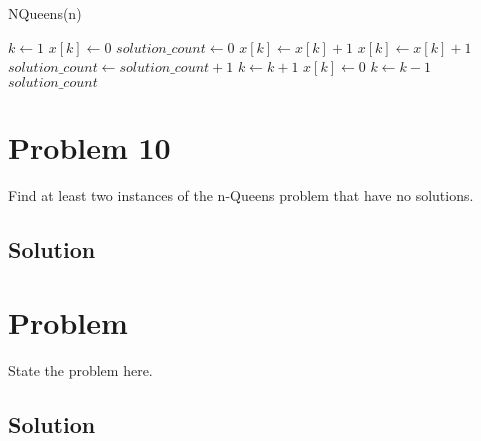 \documentclass[12pt]{article}
\begin{document}
\begin{algorithm}
    \caption{NQueens(n)}
    \begin{algorithmic}[1]
        \State $k \gets 1$
        \State $x[k] \gets 0$
        \State $solution\_count \gets 0$ 
            \State $x[k] \gets x[k] + 1$
                \State $x[k] \gets x[k] + 1$
            \EndWhile
                    \State $solution\_count \gets solution\_count + 1$ 
                \Else
                    \State $k \gets k + 1$
                    \State $x[k] \gets 0$
                \EndIf
            \Else
                \State $k \gets k - 1$
            \EndIf
        \EndWhile
        \State \Return $solution\_count$ 
    \end{algorithmic}
    \end{algorithm}
\section*{Problem 10}
Find at least two instances of the n-Queens problem that have no solutions.
\subsection*{Solution}


\section*{Problem }
State the problem here.

\subsection*{Solution}
\end{document}
